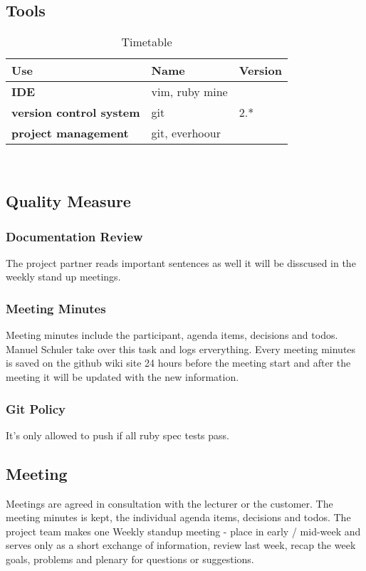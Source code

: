 \subsection{Tools}
\begin{table}[H]
  \centering
  \scriptsize
  \caption{Timetable}
  \begin{tabular}{|p{50mm}|p{15mm}|p{15mm}|}
    \hline 	\bf Use & Name & Version \\ \hline
	\bf IDE & vim, ruby mine &  \\ \hline
	\bf version control system & git & 2.* \\ \hline
	\bf project management  & git, everhoour &  \\ \hline
  \end{tabular} \\
\end{table}

\subsection{Quality Measure}

\subsubsection{Documentation Review}
The project partner reads important sentences as well it will be disscused in the weekly stand up meetings.


\subsubsection{Meeting Minutes}
Meeting minutes include the participant, agenda items, decisions and todos. Manuel Schuler take over this task and logs erverything.
Every meeting minutes is saved on the github wiki site 24 hours before the meeting start and after the meeting it will be updated with the new information.

\subsubsection{Git Policy}
It's only allowed to push if all ruby spec tests pass.


\subsection{Meeting}
Meetings are agreed in consultation with the lecturer or the customer. 
The meeting minutes is kept, the individual agenda items, decisions and todos.
The project team makes one Weekly standup meeting - place in early / mid-week and serves only as a short exchange of information, 
review last week, recap the week goals, problems and plenary for questions or suggestions.


